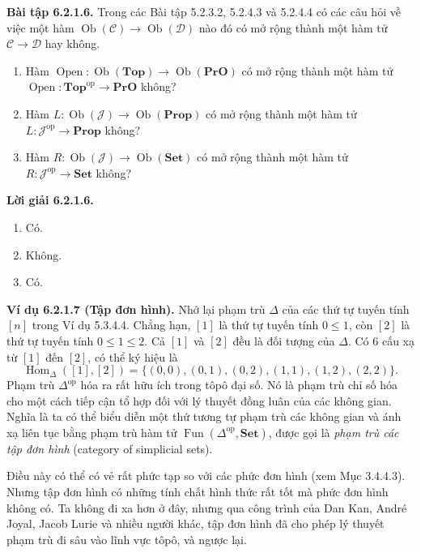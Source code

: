 \noindent\textbf{Bài tập 6.2.1.6.} Trong các Bài tập 5.2.3.2, 5.2.4.3 và 5.2.4.4 có các câu hỏi về việc một hàm $\operatorname{Ob}(\mathcal C)\to\operatorname{Ob}(\mathcal D)$ nào đó có mở rộng thành một hàm tử $\mathcal C\to\mathcal D$ hay không.
\begin{enumerate}[label=\alph*.]\item Hàm $\operatorname{Open}:\operatorname{Ob}(\mathbf{Top})\to\operatorname{Ob}(\mathbf{PrO})$ có mở rộng thành một hàm tử $\operatorname{Open}:\mathbf{Top}^{\mathrm{op}}\to\mathbf{PrO}$ không?\item Hàm $L:\operatorname{Ob}(\mathcal J)\to\operatorname{Ob}(\mathbf{Prop})$ có mở rộng thành một hàm tử $L:\mathcal J^{\mathrm{op}}\to\mathbf{Prop}$ không?\item Hàm $R:\operatorname{Ob}(\mathcal J)\to\operatorname{Ob}(\mathbf{Set})$ có mở rộng thành một hàm tử $R:\mathcal J^{\mathrm{op}}\to\mathbf{Set}$ không?\end{enumerate}
\noindent\textbf{Lời giải 6.2.1.6.}\begin{enumerate}[label=\alph*.]\item Có.\item Không.\item Có.\end{enumerate}

\noindent\textbf{Ví dụ 6.2.1.7 (Tập đơn hình).} Nhớ lại phạm trù $\Delta$ của các thứ tự tuyến tính $[n]$ trong Ví dụ 5.3.4.4. Chẳng hạn, $[1]$ là thứ tự tuyến tính $0\leq1$, còn $[2]$ là thứ tự tuyến tính $0\leq1\leq2$. Cả $[1]$ và $[2]$ đều là đối tượng của $\Delta$. Có $6$ cấu xạ từ $[1]$ đến $[2]$, có thể ký hiệu là
\[\operatorname{Hom}_{\Delta}([1],[2])=\{(0,0),(0,1),(0,2),(1,1),(1,2),(2,2)\}.\]
Phạm trù $\Delta^{\mathrm{op}}$ hóa ra rất hữu ích trong tôpô đại số. Nó là phạm trù chỉ số hóa cho một cách tiếp cận tổ hợp đối với lý thuyết đồng luân của các không gian. Nghĩa là ta có thể biểu diễn một thứ tương tự phạm trù các không gian và ánh xạ liên tục bằng phạm trù hàm tử $\operatorname{Fun}(\Delta^{\mathrm{op}},\mathbf{Set})$, được gọi là \emph{phạm trù các tập đơn hình} (category of simplicial sets).

Điều này có thể có vẻ rất phức tạp so với các phức đơn hình (xem Mục 3.4.4.3). Nhưng tập đơn hình có những tính chất hình thức rất tốt mà phức đơn hình không có. Ta
không đi xa hơn ở đây, nhưng qua công trình của Dan Kan, André Joyal, Jacob Lurie và nhiều người khác, tập đơn hình đã cho phép lý thuyết phạm trù đi sâu vào lĩnh vực tôpô, và ngược lại.

